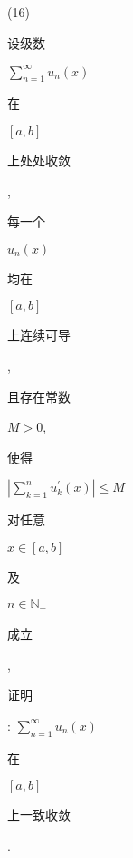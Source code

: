 \documentclass[10pt]{article}
\begin{document}
(16) \begin{CJK}{UTF8}{mj}设级数\end{CJK} $\sum_{n=1}^{\infty} u_{n}(x)$ \begin{CJK}{UTF8}{mj}在\end{CJK} $[a, b]$ \begin{CJK}{UTF8}{mj}上处处收敛\end{CJK}, \begin{CJK}{UTF8}{mj}每一个\end{CJK} $u_{n}(x)$ \begin{CJK}{UTF8}{mj}均在\end{CJK} $[a, b]$ \begin{CJK}{UTF8}{mj}上连续可导\end{CJK}, \begin{CJK}{UTF8}{mj}且存在常数\end{CJK} $M>0$, \begin{CJK}{UTF8}{mj}使得\end{CJK} $\left|\sum_{k=1}^{n} u_{k}^{\prime}(x)\right| \leq M$ \begin{CJK}{UTF8}{mj}对任意\end{CJK} $x \in[a, b]$ \begin{CJK}{UTF8}{mj}及\end{CJK} $n \in \mathbb{N}_{+}$\begin{CJK}{UTF8}{mj}成立\end{CJK}, \begin{CJK}{UTF8}{mj}证明\end{CJK}: $\sum_{n=1}^{\infty} u_{n}(x)$ \begin{CJK}{UTF8}{mj}在\end{CJK} $[a, b]$ \begin{CJK}{UTF8}{mj}上一致收敛\end{CJK}.
\end{document}
